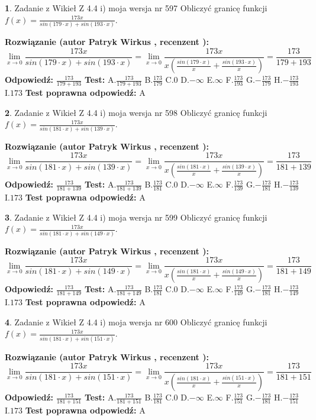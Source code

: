 \documentclass[12pt, a4paper]{article}
\theoremstyle{definition} %
\newtheorem{zad}{}
\newcommand{\zadStart}[1]{\begin{zad}#1\newline}
\newcommand{\zadStop}{\end{zad}}
\newcommand{\rozwStart}[2]{\noindent \textbf{Rozwiązanie (autor #1 , recenzent #2): }\newline}
\newcommand{\rozwStop}{\newline}
\newcommand{\odpStart}{\noindent \textbf{Odpowiedź:}\newline}
\newcommand{\odpStop}{\newline}
\newcommand{\testStart}{\noindent \textbf{Test:}\newline}
\newcommand{\testStop}{\newline}
\newcommand{\kluczStart}{\noindent \textbf{Test poprawna odpowiedź:}\newline}
\newcommand{\kluczStop}{\newline}
\begin{document}
\zadStart{Zadanie z Wikieł Z 4.4 i) moja wersja nr 597}
Obliczyć granicę funkcji $f(x)=\frac{173x}{sin(179\cdot x) +sin(193\cdot x)}$.
\zadStop
\rozwStart{Patryk Wirkus}{}
$$\lim\limits_{x\to 0}\frac{173x}{sin(179\cdot x) +sin(193\cdot x)}=\lim\limits_{x\to 0}\frac{173x}{x(\frac{sin(179\cdot x)}{x}+\frac{sin(193\cdot x)}{x})}=\frac{173}{179+193}$$
\rozwStop
\odpStart
$\frac{173}{179+193}$
\odpStop
\testStart
A.$\frac{173}{179+193}$
B.$\frac{173}{179}$
C.$0$
D.$-\infty$
E.$\infty$
F.$\frac{173}{193}$
G.$-\frac{173}{179}$
H.$-\frac{173}{193}$
I.$173$
\testStop
\kluczStart
A
\kluczStop



\zadStart{Zadanie z Wikieł Z 4.4 i) moja wersja nr 598}
Obliczyć granicę funkcji $f(x)=\frac{173x}{sin(181\cdot x) +sin(139\cdot x)}$.
\zadStop
\rozwStart{Patryk Wirkus}{}
$$\lim\limits_{x\to 0}\frac{173x}{sin(181\cdot x) +sin(139\cdot x)}=\lim\limits_{x\to 0}\frac{173x}{x(\frac{sin(181\cdot x)}{x}+\frac{sin(139\cdot x)}{x})}=\frac{173}{181+139}$$
\rozwStop
\odpStart
$\frac{173}{181+139}$
\odpStop
\testStart
A.$\frac{173}{181+139}$
B.$\frac{173}{181}$
C.$0$
D.$-\infty$
E.$\infty$
F.$\frac{173}{139}$
G.$-\frac{173}{181}$
H.$-\frac{173}{139}$
I.$173$
\testStop
\kluczStart
A
\kluczStop



\zadStart{Zadanie z Wikieł Z 4.4 i) moja wersja nr 599}
Obliczyć granicę funkcji $f(x)=\frac{173x}{sin(181\cdot x) +sin(149\cdot x)}$.
\zadStop
\rozwStart{Patryk Wirkus}{}
$$\lim\limits_{x\to 0}\frac{173x}{sin(181\cdot x) +sin(149\cdot x)}=\lim\limits_{x\to 0}\frac{173x}{x(\frac{sin(181\cdot x)}{x}+\frac{sin(149\cdot x)}{x})}=\frac{173}{181+149}$$
\rozwStop
\odpStart
$\frac{173}{181+149}$
\odpStop
\testStart
A.$\frac{173}{181+149}$
B.$\frac{173}{181}$
C.$0$
D.$-\infty$
E.$\infty$
F.$\frac{173}{149}$
G.$-\frac{173}{181}$
H.$-\frac{173}{149}$
I.$173$
\testStop
\kluczStart
A
\kluczStop



\zadStart{Zadanie z Wikieł Z 4.4 i) moja wersja nr 600}
Obliczyć granicę funkcji $f(x)=\frac{173x}{sin(181\cdot x) +sin(151\cdot x)}$.
\zadStop
\rozwStart{Patryk Wirkus}{}
$$\lim\limits_{x\to 0}\frac{173x}{sin(181\cdot x) +sin(151\cdot x)}=\lim\limits_{x\to 0}\frac{173x}{x(\frac{sin(181\cdot x)}{x}+\frac{sin(151\cdot x)}{x})}=\frac{173}{181+151}$$
\rozwStop
\odpStart
$\frac{173}{181+151}$
\odpStop
\testStart
A.$\frac{173}{181+151}$
B.$\frac{173}{181}$
C.$0$
D.$-\infty$
E.$\infty$
F.$\frac{173}{151}$
G.$-\frac{173}{181}$
H.$-\frac{173}{151}$
I.$173$
\testStop
\kluczStart
A
\kluczStop
\end{document}

